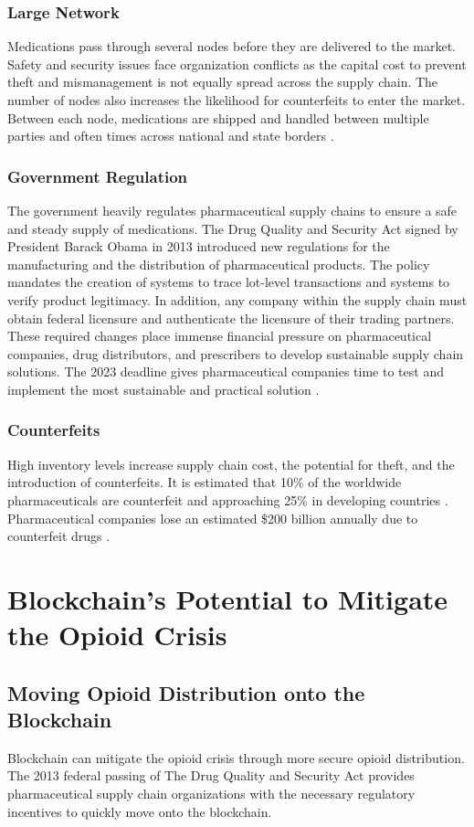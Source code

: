 \documentclass[sigconf]{acmart}
\begin{document}
\subsubsection{Large Network} Medications pass through several nodes before they are delivered to the market. Safety and security issues face organization conflicts as the capital cost to prevent theft and mismanagement is not equally spread across the supply chain. The number of nodes also increases the likelihood for counterfeits to enter the market. Between each node, medications are shipped and handled between multiple parties and often times across national and state borders \cite{Shah01}.
\subsubsection{Government Regulation} The government heavily regulates pharmaceutical supply chains to ensure a safe and steady supply of medications. The Drug Quality and Security Act \cite{DQASA} signed by President Barack Obama in 2013 introduced new regulations for the manufacturing and the distribution of pharmaceutical products. The policy mandates the creation of systems to trace lot-level transactions and systems to verify product legitimacy. In addition, any company within the supply chain must obtain federal licensure and authenticate the licensure of their trading partners. These required changes place immense financial pressure on pharmaceutical companies, drug distributors, and prescribers to develop sustainable supply chain solutions. The 2023 deadline gives pharmaceutical companies time to test and implement the most sustainable and practical solution \cite{opsis8}.
\subsubsection{Counterfeits} High inventory levels increase supply chain cost, the potential for theft, and the introduction of counterfeits. It is estimated that 10\% of the worldwide pharmaceuticals are counterfeit and approaching 25\% in developing countries \cite{Kelesidis01}. Pharmaceutical companies lose an estimated \$200 billion annually due to counterfeit drugs \cite{das2017}.  

\section{Blockchain's Potential to Mitigate the Opioid Crisis}
\subsection{Moving Opioid Distribution onto the Blockchain}
Blockchain can mitigate the opioid crisis through more secure opioid distribution. The 2013 federal passing of The Drug Quality and Security Act \cite{DQASA} provides pharmaceutical supply chain organizations with the necessary regulatory incentives to quickly move onto the blockchain.
\end{document}
